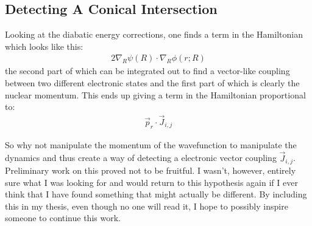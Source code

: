 \subsection{Detecting A Conical Intersection}
Looking at the diabatic energy corrections, one finds a term in the Hamiltonian which looks like this:
\begin{align}
   2\nabla_R \psi(R) \cdot \nabla_R \phi(r;R)
\end{align}
the second part of which can be integrated out to find a vector-like coupling between two different electronic states and the first part of which is clearly the nuclear momentum.  This ends up giving a term in the Hamiltonian proportional to:
\begin{align}
   \vec{p}_{r}\cdot \vec{J}_{i,j}
\end{align}


So why not manipulate the momentum of the wavefunction to manipulate the dynamics and thus create a way of detecting a electronic vector coupling $\vec{J}_{i,j}$.  Preliminary work on this proved not to be fruitful.  I wasn't, however, entirely sure what I was looking for and would return to this hypothesis again if I ever think that I have found something that might actually be different.  By including this in my thesis, even though no one will read it, I hope to possibly inspire someone to continue this work.
